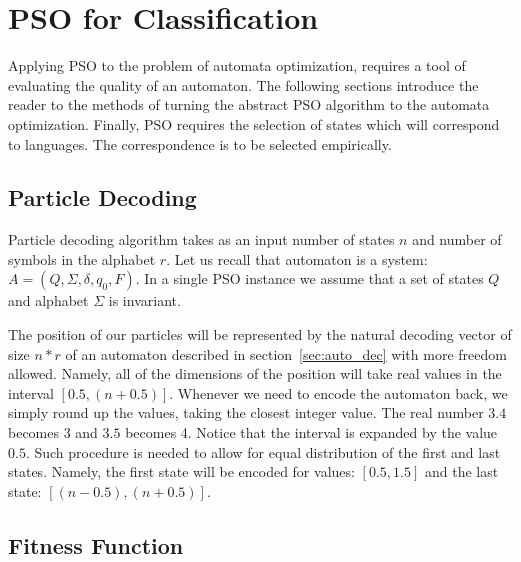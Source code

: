 \documentclass{mini}
\begin{document}
\section{PSO for Classification}
 
Applying PSO to the problem of automata optimization, requires a tool of evaluating the quality of an automaton. The following sections introduce the reader to the methods of turning the abstract PSO algorithm to the  automata optimization. Finally, PSO requires the selection of states which will correspond to languages. The correspondence is to be selected empirically. 

\subsection{Particle Decoding}


Particle decoding algorithm takes as an input number of states $n$ and number of symbols in the alphabet $r$.
Let us recall that automaton is a system: $A = (Q, \Sigma, \delta, q_0, F)$. In a single PSO instance we assume that a set of states $Q$ and alphabet $\Sigma$ is invariant. 

The position of our particles will be represented by the natural decoding vector of size $n*r$ of an automaton described in section~\ref{sec:auto_dec} with more freedom allowed. Namely, all of the dimensions of the position will take real values in the interval $[0.5, (n+0.5)]$. Whenever we need to encode the automaton back, we simply round up the values, taking the closest integer value. The real number $3.4$ becomes $3$ and $3.5$ becomes 4. Notice that the interval is expanded by the value $0.5$. Such procedure is needed to allow for equal distribution of the first and last states. Namely, the first state will be encoded for values: $[0.5, 1.5]$ and the last state: $[(n-0.5), (n+0.5)]$.

\subsection{Fitness Function}
\end{document}
